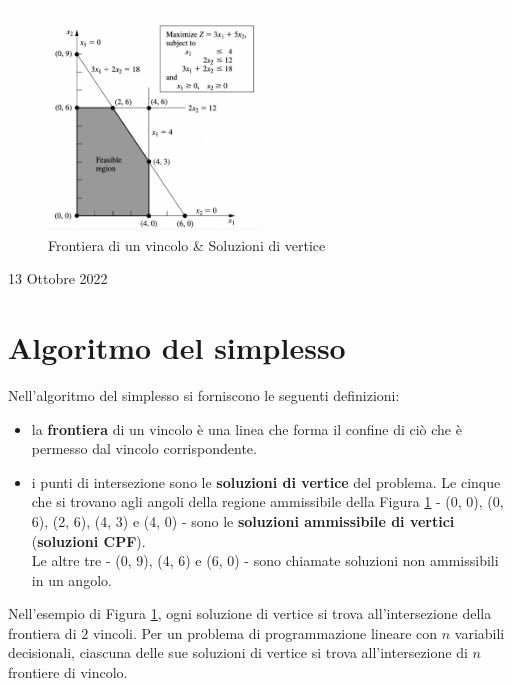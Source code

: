 \documentclass[a4paper]{extarticle}
\begin{document}
\begin{figure}[H]
    \centering
    \includegraphics[width=0.5\textwidth]{Frontiera_vincolo_soluzioni_vertice}
    \caption{Frontiera di un vincolo \& Soluzioni di vertice}
    \label{fig:fig1}
\end{figure}

\newpage
\begin{center}
    13 Ottobre 2022
\end{center}
\section{Algoritmo del simplesso}
Nell'algoritmo del simplesso si forniscono le seguenti definizioni:
\begin{itemize}
    \item la \textbf{frontiera} di un vincolo è una linea che forma il confine di ciò che è permesso dal vincolo corrispondente.
    \item i punti di intersezione sono le \textbf{soluzioni di vertice} del problema. Le cinque che si trovano agli angoli della regione ammissibile della Figura \ref{fig:fig1} - (0, 0), (0, 6), (2, 6), (4, 3) e (4, 0) - sono le \textbf{soluzioni ammissibile di vertici} (\textbf{soluzioni CPF}).\\
    Le altre tre - (0, 9), (4, 6) e (6, 0) - sono chiamate soluzioni non ammissibili in un angolo.
\end{itemize}

\noindent
Nell'esempio di Figura \ref{fig:fig1}, ogni soluzione di vertice si trova all'intersezione della frontiera di $2$ vincoli. Per un problema di programmazione lineare con $n$ variabili decisionali, ciascuna delle sue soluzioni di vertice si trova all'intersezione di $n$ frontiere di vincolo.

\vspace{1em}
\end{document}
